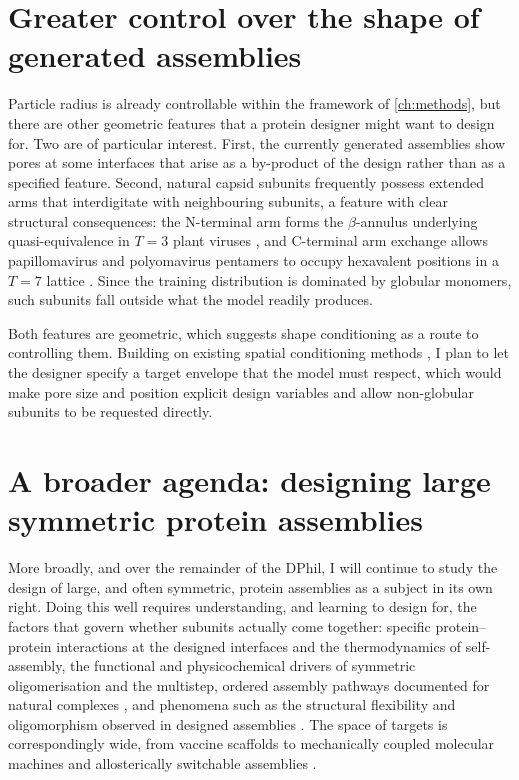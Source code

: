 \section{Greater control over the shape of generated assemblies}
\label{sec:shape-control}


Particle radius is already controllable within the framework of
\cref{ch:methods}, but there are other geometric features that a protein designer might want to design for. Two are of
particular interest. First, the currently generated assemblies show pores at some interfaces that arise as a by-product of the design rather than as a specified feature. Second, natural capsid subunits frequently possess extended arms that interdigitate with neighbouring subunits, a feature with clear structural
consequences: the N-terminal arm forms the $\beta$-annulus underlying
quasi-equivalence in $T{=}3$ plant viruses \parencite{harrison_protein_2017}, and
C-terminal arm exchange allows papillomavirus and polyomavirus pentamers to
occupy hexavalent positions in a $T{=}7$ lattice
\parencite{liddingtonStructureSimianVirus1991}. Since the training distribution is dominated
by globular monomers, such subunits fall outside what the model readily
produces.

Both features are geometric, which suggests shape conditioning as a route to
controlling them. Building on existing spatial conditioning methods
\parencite{ingrahamIlluminatingProteinSpace2023,stark_protcomposer_2025,faltings_proxelgen_2025,raghu_multiscale_2025,li_robust_2026},
I plan to let the designer specify a target envelope that the model must
respect, which would make pore size and position explicit design variables and
allow non-globular subunits to be requested directly.


\section{A broader agenda: designing large symmetric protein assemblies}
\label{sec:broad-agenda}

More broadly, and over the remainder of the DPhil, I will continue to study the
design of large, and often symmetric, protein assemblies as a subject in its own
right. Doing this well requires understanding, and learning to design for, the
factors that govern whether subunits actually come together: specific
protein--protein interactions at the designed interfaces and the
thermodynamics of self-assembly, the functional and physicochemical drivers of
symmetric oligomerisation \parencite{goodsell_structural_2000} and the multistep,
ordered assembly pathways documented for natural complexes
\parencite{marsh_structure_2015}, and phenomena such as the structural
flexibility and oligomorphism observed in designed assemblies
\parencite{khmelinskaia_local_2025}.
The space of targets is correspondingly wide, from vaccine scaffolds to
mechanically coupled molecular machines \parencite{courbet_computational_2022} and
allosterically switchable assemblies \parencite{pillai_novo_2024}.

